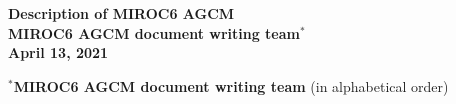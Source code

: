 \documentclass[11pt,a4paper,onecolumn]{article}
\begin{document}
  \begin{titlepage} %
    \vspace*{\fill}
      \begin{center}
        {\Huge \textbf{Description of MIROC6 AGCM}}\\
        \vspace{100mm}
        {\Large \textbf{MIROC6 AGCM document writing team$^*$}}\\
        \vspace{30mm}
        {\Large \textbf{April 13, 2021}}
      \end{center}
    \vspace*{\fill}
    $^*${\bf\textbf{MIROC6 AGCM document writing team}} (in alphabetical order)
    
  \end{titlepage}
%
  \clearpage
  
  \clearpage
  
  \clearpage
  
	\tableofcontents
	\clearpage
	\def\tightlist{\itemsep1pt\parskip0pt\parsep0pt}
  
  
	
	
	
	
	
	
	
	
	
	
	
	
	
	
	
	
	
	
	
	
	


%	
%	

\end{document}
